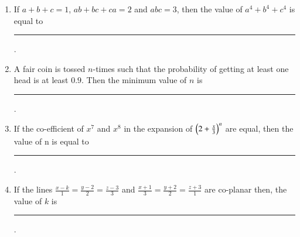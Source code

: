 \documentclass[journal,12pt,onecolumn]{IEEEtran}
\theoremstyle{remark}
\begin{document}
\begin{enumerate}
\hfill{}

\item If $a+b+c=1$, $ab+bc+ca=2$ and $abc=3$, then the value of $a^4+b^4+c^4$ is equal to \rule{1cm}{0.15mm}.

\hfill{}

\item A fair coin is tossed $n$-times such that the probability of getting at least one head is at least $0.9$. Then the minimum value of $n$ is \rule{1cm}{0.15mm}. 

\hfill{}

\item If the co-efficient of $x^7$ and $x^8$ in the expansion of $\left(2+\frac{x}{3}\right)^n$ are equal, then the value of n is equal to \rule{1cm}{0.15mm}.

\hfill{}

\item If the lines $\frac{x-k}{1}=\frac{y-2}{2}=\frac{z-3}{3}$ and $\frac{x+1}{3}=\frac{y+2}{2}=\frac{z+3}{1}$ are co-planar then, the value of $k$ is \rule{1cm}{0.15mm}.

\hfill{}

\end{enumerate}
\end{document}
